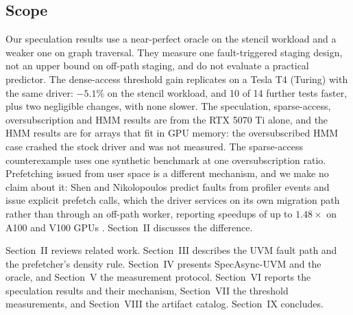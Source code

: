 \subsection{Scope}

Our speculation results use a near-perfect oracle on the stencil workload and a
weaker one on graph traversal. They measure one fault-triggered staging design,
not an upper bound on off-path staging, and do not evaluate a practical
predictor. The dense-access threshold gain
replicates on a Tesla T4 (Turing) with the same driver: $-5.1\%$ on the stencil
workload, and 10 of 14 further tests faster, plus two negligible changes, with
none slower. The speculation,
sparse-access, oversubscription and HMM results are from the RTX 5070 Ti alone,
and the HMM results are for arrays that fit in GPU memory: the oversubscribed
HMM case crashed the stock driver and was not measured. The
sparse-access counterexample uses one synthetic benchmark at one
oversubscription ratio. Prefetching issued from user space is a different
mechanism, and we make no claim about it: Shen and Nikolopoulos predict faults
from profiler events and issue explicit prefetch calls, which the driver
services on its own migration path rather than through an off-path worker,
reporting speedups of up to $1.48\times$ on A100 and V100 GPUs
\cite{shen2026stride}. Section~II discusses the difference.

Section~II reviews related work. Section~III describes the UVM fault path and
the prefetcher's density rule. Section~IV presents SpecAsync-UVM and the oracle,
and Section~V the measurement protocol. Section~VI reports the speculation
results and their mechanism, Section~VII the threshold measurements, and
Section~VIII the artifact catalog. Section~IX concludes.
